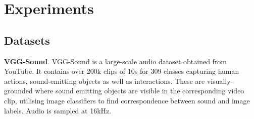 \documentclass{article}
\begin{document}
\begin{table}[t!]
\centering
{}
\caption{Results on VGG-Sound. We compare to published results and show ablations.}
\vspace*{-12pt}
\label{tab:vggsound_res}
\end{table}

\section{Experiments}
\label{sec:experiments}
 
\subsection{Datasets}
\label{subsec:datasets}

\textbf{VGG-Sound}. VGG-Sound \cite{vggsound} is a large-scale audio dataset obtained from YouTube. It contains over 200k clips of 10s for 309 classes  
capturing human actions, sound-emitting objects as well as interactions. These are visually-grounded where sound emitting objects are visible in the corresponding video clip, utilising image classifiers to find correspondence between sound and image labels. Audio is sampled at 16kHz.
\end{document}
